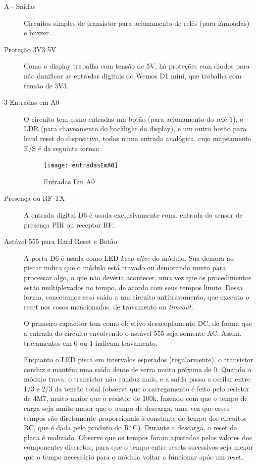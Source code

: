 \begin{description}
\item [A - Saídas] Circuitos simples de transistor para acionamento de relés (para lâmpadas) e buzzer.
\item [Proteção 3V3 5V] Como o display trabalha com tensão de 5V, há proteções com diodos para não danificar as entradas digitais do Wemos D1 mini, que trabalha com tensão de 3V3.
\item [3 Entradas em A0] O circuito tem como entradas um botão (para acionamento do relé 1), o LDR (para chaveamento do backlight do display), e um outro botão para hard reset do dispositivo, todos numa entrada analógica, cujo mapeamento E/S é da seguinte forma:

\begin{figure}[H]
	\centering
	\caption{Entradas Em A0}
  \texttt{[image: entradasEmA0]}
\label{fig:entradasEmA0}
\end{figure}

\item [Presença ou RF-TX] A entrada digital D6 é usada exclusivamente como entrada do sensor de presença PIR ou receptor RF.
\item [Astável 555 para Hard Reset e Botão] A porta D6 é usada como LED \textit{keep alive} do módulo. Sua demora ao piscar indica que o módulo está travado ou demorando muito para processar algo, o que não deveria acontecer, uma vez que os procedimentos estão multiplexados no tempo, de acordo com seus tempos limite. Dessa forma, conectamos essa saída a um circuito antitravamento, que executa o reset nos casos mencionados, de travamento ou \textit{timeout}.

O primeiro capacitor tem como objetivo desacoplamento DC, de forma que a entrada do circuito envolvendo o astável 555 seja somente AC. Assim, travamentos em 0 ou 1 indicam travamento.

Enquanto o LED pisca em intervalos esperados (regularmente), o transistor conduz e mantém uma saída dente de serra muito próxima de 0. Quando o módulo trava, o transistor não conduz mais, e a saída passa a oscilar entre 1/3 e 2/3 da tensão total (observe que o carregamento é feito pelo resistor de 4M7, muito maior que o resistor de 100k, fazendo com que o tempo de carga seja muito maior que o tempo de descarga, uma vez que esses tempos são diretamente proporcionais à constante de tempo dos circuitos RC, que é dada pelo produto do R*C). Durante a descarga, o reset da placa é realizado. Observe que os tempos foram ajustados pelos valores dos componentes discretos, para que o tempo entre resets sucessivos seja menor que o tempo necessário para o módulo voltar a funcionar após um reset.


\end{description}
